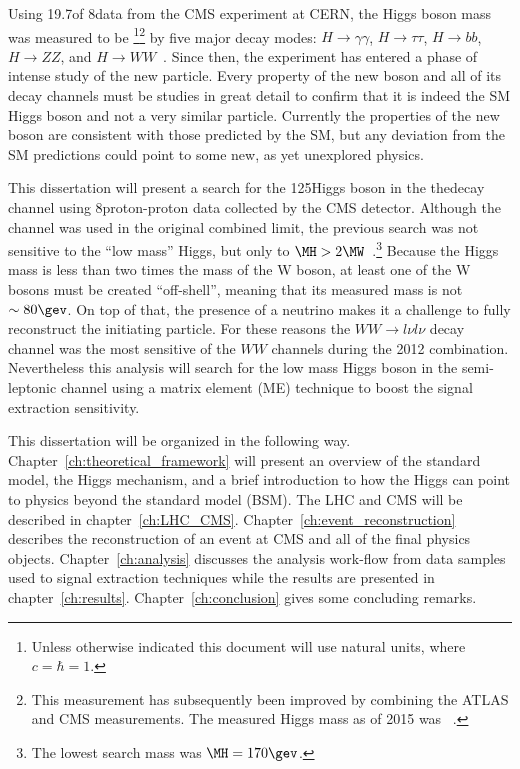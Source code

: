 Using 19.7\fbinv of 8\tev data from the CMS experiment at CERN, the Higgs boson mass was measured to be \footnote{Unless otherwise indicated this document will use natural units, where $c=\hbar=1$.}\footnote{This measurement has subsequently been improved by combining the ATLAS and CMS measurements. The measured Higgs mass as of 2015 was ~\cite{Aad:2015zhl}.} by five major decay modes: $H\rightarrow\gamma\gamma$, $H\rightarrow\tau\tau$, $H\rightarrow{bb}$, $H\rightarrow{ZZ}$, and $H\rightarrow{WW}$~\cite{CMS-PAS-HIG-13-005}.
Since then, the experiment has entered a phase of intense study of the new particle.
Every property of the new boson and all of its decay channels must be studies in great detail to confirm that it is indeed the SM Higgs boson and not a very similar particle.
Currently the properties of the new boson are consistent with those predicted by the SM, but any deviation from the SM predictions could point to some new, as yet unexplored physics.

This dissertation will present a search for the 125\gev Higgs boson in the the\newline\HWWlnujj decay channel using 8\tev proton-proton data collected by the CMS detector.
Although the \HWWlnujj channel was used in the original combined limit, the previous search was not sensitive to the ``low mass'' Higgs, but only to 
$\MH>2\MW$~\cite{CMS-PAS-HIG-13-027}.\footnote{The lowest search mass was $\MH=170\gev$.}
Because the Higgs mass is less than two times the mass of the W boson, at least one of the W bosons must be created ``off-shell'', meaning that its measured mass is not $\sim80\gev$.
On top of that, the presence of a neutrino makes it a challenge to fully reconstruct the initiating particle.
For these reasons the $WW\rightarrow{l\nu}{l\nu}$ decay channel was the most sensitive of the $WW$ channels during the 2012 combination.
Nevertheless this analysis will search for the low mass Higgs boson in the semi-leptonic channel using a matrix element (ME) technique to boost the signal extraction sensitivity.

This dissertation will be organized in the following way.
Chapter~\ref{ch:theoretical_framework} will present an overview of the standard model, the Higgs mechanism, and a brief introduction to how the Higgs can point to physics beyond the standard model (BSM).
The LHC and CMS will be described in chapter~\ref{ch:LHC_CMS}.
Chapter~\ref{ch:event_reconstruction} describes the reconstruction of an event at CMS and all of the final physics objects.
Chapter~\ref{ch:analysis} discusses the analysis work-flow from data samples used to signal extraction techniques while the results are presented in chapter~\ref{ch:results}.
Chapter~\ref{ch:conclusion} gives some concluding remarks.

